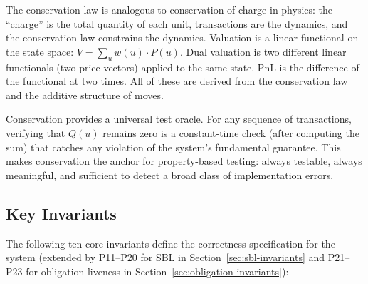 \documentclass[11pt,a4paper]{article}
\begin{document}
The conservation law is analogous to conservation of charge in physics: the ``charge'' is the total quantity of each unit, transactions are the dynamics, and the conservation law constrains the dynamics. Valuation is a linear functional on the state space: $V = \sum_u w(u) \cdot P(u)$. Dual valuation is two different linear functionals (two price vectors) applied to the same state. PnL is the difference of the functional at two times. All of these are derived from the conservation law and the additive structure of moves.

Conservation provides a universal test oracle. For any sequence of transactions, verifying that $Q(u)$ remains zero is a constant-time check (after computing the sum) that catches any violation of the system's fundamental guarantee. This makes conservation the anchor for property-based testing: always testable, always meaningful, and sufficient to detect a broad class of implementation errors.

\subsection{Key Invariants}

The following ten core invariants define the correctness specification for the system (extended by P11--P20 for SBL in Section~\ref{sec:sbl-invariants} and P21--P23 for obligation liveness in Section~\ref{sec:obligation-invariants}):
\end{document}
